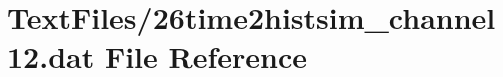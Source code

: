 \hypertarget{26time2histsim__channel12_8dat}{}\section{Text\+Files/26time2histsim\+\_\+channel12.dat File Reference}
\label{26time2histsim__channel12_8dat}
